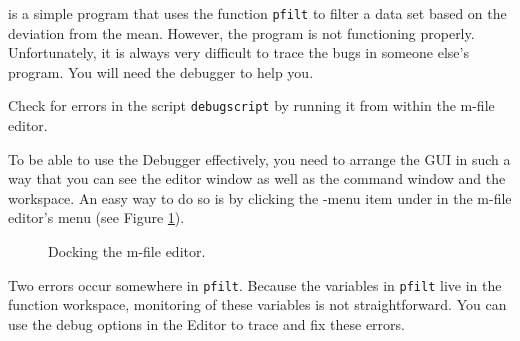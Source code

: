  is a simple program that uses the function {\tt pfilt} to filter a data set based on the deviation from the mean. However, the program is not functioning properly. Unfortunately, it is always very difficult to trace the bugs in someone else's program. You will need the \MATLAB{} debugger to help you.


\begin{action}	
Check for errors in the script {\tt debugscript} by running it from within the m-file editor.
\end{action}

\begin{action}
To be able to use the Debugger effectively, you need to arrange the GUI in such a way that you can see the editor window as well as the command window and the workspace. An easy way to do so is by clicking the -menu item under  in the m-file editor's menu (see Figure \ref{fig:dock-editor}).
\end{action}


\begin{figure}[!htb]
  \centering
  \caption{Docking the m-file editor.}\label{fig:dock-editor}
\end{figure}






\noindent Two errors occur somewhere in {\tt pfilt}. Because the variables in {\tt pfilt} live in the function workspace, monitoring of these variables is not straightforward. You can use the debug options in the Editor to trace and fix these errors. 

